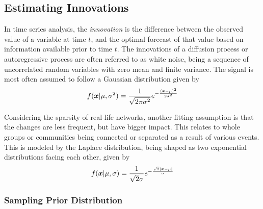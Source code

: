 \subsection{Estimating Innovations}\label{sec:pyimpl-innovations}

    In time series analysis, the \emph{innovation} is the difference between the observed value of a variable at time $t$, and the optimal forecast of that value based on information available prior to time $t$. The innovations of a diffusion process or autoregressive process are often referred to as white noise, being a sequence of uncorrelated random variables with zero mean and finite variance. The signal is most often assumed to follow a Gaussian distribution given by
    \begin{equation}
        f(\bm{x}\vert\mu,\sigma^2) = \frac{1}{\sqrt{2\pi\sigma^2}}e^{-\frac{(\bm{x}-\mu)^2}{2\sigma^2}}
    \end{equation}
    
    Considering the sparsity of real-life networks, another fitting assumption is that the changes are less frequent, but have bigger impact. This relates to whole groups or communities being connected or separated as a result of various events. This is modeled by the Laplace distribution, being shaped as two exponential distributions facing each other, given by
    \begin{equation}
        f(\bm{x}\vert\mu,\sigma)=\frac{1}{\sqrt{2}\sigma}e^{-\frac{\sqrt{2}|\bm{x}-\mu|}{\sigma}}
    \end{equation}
    
    \subsubsection{Sampling Prior Distribution}
    
